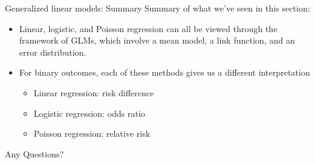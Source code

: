 \documentclass[10pt,t]{beamer}
\begin{document}
\begin{frame}{Generalized linear models: Summary}
	Summary of what we've seen in this section:
	\begin{itemize}
		\item Linear, logistic, and Poisson regression can all be viewed through the framework of GLMs, which involve a mean model, a link function, and an error distribution.
		\item For binary outcomes, each of these methods gives us a different interpretation
		\begin{itemize}
			\item Linear regression: risk difference
			\item Logistic regression: odds ratio
			\item Poisson regression: relative risk
		\end{itemize}
	\end{itemize}
\end{frame}

\begin{frame}[c]
	\centering \huge Any Questions?
\end{frame}
\end{document}
